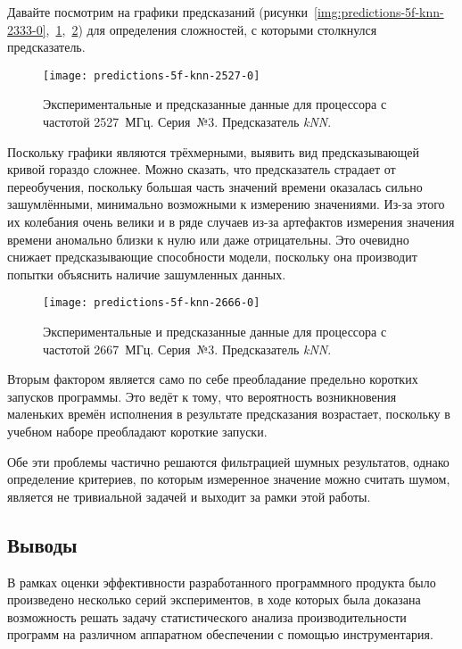 Давайте посмотрим на графики предсказаний (рисунки~\ref{img:predictions-5f-knn-2333-0},~\ref{img:predictions-5f-knn-2527-0},~\ref{img:predictions-5f-knn-2666-0}) для определения сложностей, с которыми столкнулся предсказатель.

\begin{figure}[H]
    \begin{center}
        \texttt{[image: predictions-5f-knn-2527-0]}
        \caption{Экспериментальные и предсказанные данные для процессора с частотой 2527~МГц. Серия~№3. Предсказатель \textit{kNN}.}
        \label{img:predictions-5f-knn-2527-0}
    \end{center}
\end{figure}

Поскольку графики являются трёхмерными, выявить вид предсказывающей кривой гораздо сложнее. Можно сказать, что предсказатель страдает от переобучения, поскольку большая часть значений времени оказалась сильно зашумлёнными, минимально возможными к измерению значениями. Из-за этого их колебания очень велики и в ряде случаев из-за артефактов измерения значения времени аномально близки к нулю или даже отрицательны. Это очевидно снижает предсказывающие способности модели, поскольку она производит попытки объяснить наличие зашумленных данных.

\begin{figure}[H]
    \begin{center}
        \texttt{[image: predictions-5f-knn-2666-0]}
        \caption{Экспериментальные и предсказанные данные для процессора с частотой 2667~МГц. Серия~№3. Предсказатель \textit{kNN}.}
        \label{img:predictions-5f-knn-2666-0}
    \end{center}
\end{figure}

Вторым фактором является само по себе преобладание предельно коротких запусков программы. Это ведёт к тому, что вероятность возникновения маленьких времён исполнения в результате предсказания возрастает, поскольку в учебном наборе преобладают короткие запуски.

Обе эти проблемы частично решаются фильтрацией шумных результатов, однако определение критериев, по которым измеренное значение можно считать шумом, является не тривиальной задачей и выходит за рамки этой работы.


\subsection{Выводы}
В рамках оценки эффективности разработанного программного продукта было произведено несколько серий экспериментов, в ходе которых была доказана возможность решать задачу статистического анализа производительности программ на различном аппаратном обеспечении с помощью инструментария.